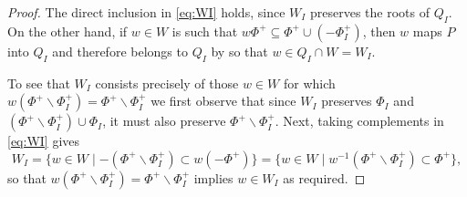 \documentclass[12pt]{amsart}
\theoremstyle{remark}
\begin{document}
\begin{proof}
The direct inclusion in \eqref{eq:WI} holds, since $W_I$ preserves the roots of $Q_I$. On the other hand, if $w\in W$ is such that $w \Phi^+\subseteq \Phi^+\cup (-\Phi_I^+)$, then  $w$ maps $P$ into $Q_I$ and therefore belongs to $Q_I$ by \cite[\S 29.3, Lemma D]{Humphreys} so that $w\in Q_I\cap W=W_I$.

To see that $W_I$ consists precisely of those $w\in W$ for which $w(\Phi^+ \smallsetminus \Phi_I^+) = \Phi^+ \smallsetminus \Phi_I^+$  we first observe that since $W_I$ preserves $\Phi_I$ and $(\Phi^+ \smallsetminus \Phi_I^+) \cup \Phi_I$, it must also preserve $\Phi^+ \smallsetminus \Phi_I^+$. Next, taking complements in \eqref{eq:WI} gives
\[
W_I  = \{w\in W \mid -( \Phi^+ \smallsetminus \Phi_I^+) \subset w (- \Phi^+) \}  = \{w\in W \mid w^{-1}( \Phi^+ \smallsetminus \Phi_I^+) \subset \Phi^+ \},
\]
%
so that $w(\Phi^+ \smallsetminus \Phi_I^+) = \Phi^+ \smallsetminus \Phi_I^+$ implies $w \in W_I$ as required.


\end{proof}
\end{document}

